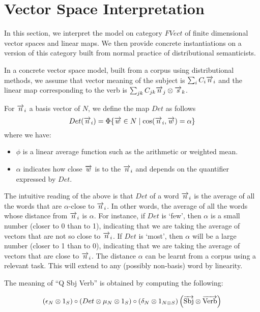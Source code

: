 \section{Vector Space Interpretation}


In this section, we interpret the model on category $FVect$ of finite dimensional vector spaces and linear maps. We then provide concrete instantiations on a version of this category built from normal practice of distributional semanticists. 

In a concrete vector space model, built from a corpus using distributional methods, we assume that  vector meaning of the subject is $\sum_i C_i \overrightarrow{n}_i$ and the linear map corresponding to the verb is $\sum_{jk} C_{jk} \overrightarrow{n}_j \otimes \overrightarrow{s}_k$. 

For $\overrightarrow{n}_i$ a basis vector of $N$, we define  the map $Det$  as follows 
\[
Det(\overrightarrow{n}_i) = \Phi \{\overrightarrow{w} \in N \mid \cos(\overrightarrow{n}_i, \overrightarrow{w}) = \alpha\}
\]
where we have:
\begin{itemize}
\item  $\phi$ is a linear average function such as the   arithmetic or weighted mean. 
\item  $\alpha$ indicates how close $\overrightarrow{w}$ is to the $\overrightarrow{n}_i$ and depends on the quantifier expressed by $Det$. 
\end{itemize}

\noindent
The intuitive reading of the above is that $Det$ of a word $\overrightarrow{n}_i$ is the average of all the words that are $\alpha$-close to $\overrightarrow{n}_i$. In other words, the average of all the words  whose distance from $\overrightarrow{n}_i$ is $\alpha$.  For instance, if $Det$ is `few', then $\alpha$ is a small number (closer to 0 than to 1), indicating that we are taking the average of vectors that are not so close to $\overrightarrow{n}_i$. If $Det$ is `most', then $\alpha$ will be a large number (closer to 1 than to 0), indicating that we are taking the average of vectors that are close to $\overrightarrow{n}_i$. The distance $\alpha$ can be learnt from a corpus using a relevant task. This will extend to any (possibly non-basis) word by linearity. 

The meaning of ``Q Sbj Verb'' is obtained by computing the following:

\[
(\epsilon_N \otimes 1_S) \circ (Det \otimes  \mu_N \otimes 1_S) \circ (\delta_N \otimes 1_{N \otimes S})\left(\overrightarrow{\text{Sbj}} \otimes \overrightarrow{\text{Verb}}\right)
\]

